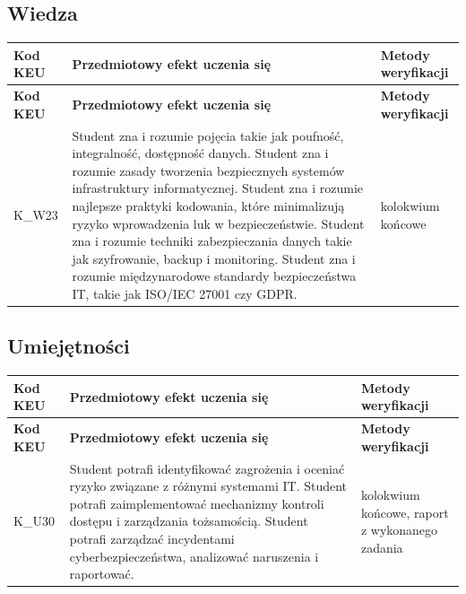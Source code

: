 \documentclass[12pt, a4paper]{article}
\newcommand{\thdrule}{\noalign{\global\setlength{\extrarowheight}{0pt}}}
\newcommand{\thdend}{\noalign{\global\setlength{\extrarowheight}{3pt}}}
\begin{document}
\subsection*{Wiedza}
{\scriptsize
\begin{longtable}{m{1.6cm}m{9.0cm}m{4.2cm}}
\thdrule\toprule
\rowcolor{pjatkRed} {\color{white}\footnotesize\textbf{\vphantom{Ag}Kod KEU}} & {\color{white}\footnotesize\textbf{\vphantom{Ag}Przedmiotowy efekt uczenia się}} & {\color{white}\footnotesize\textbf{\vphantom{Ag}Metody weryfikacji}} \\
\midrule\thdend
\endfirsthead
\thdrule\toprule
\rowcolor{pjatkRed} {\color{white}\footnotesize\textbf{\vphantom{Ag}Kod KEU}} & {\color{white}\footnotesize\textbf{\vphantom{Ag}Przedmiotowy efekt uczenia się}} & {\color{white}\footnotesize\textbf{\vphantom{Ag}Metody weryfikacji}} \\
\midrule\thdend
\endhead
  \rowcolor{tableRowLight} K\_W23 & Student zna i rozumie pojęcia takie jak poufność, integralność, dostępność danych. Student zna i rozumie zasady tworzenia bezpiecznych systemów infrastruktury informatycznej. Student zna i rozumie najlepsze praktyki kodowania, które minimalizują ryzyko wprowadzenia luk w bezpieczeństwie. Student zna i rozumie techniki zabezpieczania danych takie jak szyfrowanie, backup i monitoring. Student zna i rozumie międzynarodowe standardy bezpieczeństwa IT, takie jak ISO/IEC 27001 czy GDPR. & kolokwium końcowe \\
\bottomrule
\end{longtable}}

\subsection*{Umiejętności}
{\scriptsize
\begin{longtable}{m{1.6cm}m{9.0cm}m{4.2cm}}
\thdrule\toprule
\rowcolor{pjatkRed} {\color{white}\footnotesize\textbf{\vphantom{Ag}Kod KEU}} & {\color{white}\footnotesize\textbf{\vphantom{Ag}Przedmiotowy efekt uczenia się}} & {\color{white}\footnotesize\textbf{\vphantom{Ag}Metody weryfikacji}} \\
\midrule\thdend
\endfirsthead
\thdrule\toprule
\rowcolor{pjatkRed} {\color{white}\footnotesize\textbf{\vphantom{Ag}Kod KEU}} & {\color{white}\footnotesize\textbf{\vphantom{Ag}Przedmiotowy efekt uczenia się}} & {\color{white}\footnotesize\textbf{\vphantom{Ag}Metody weryfikacji}} \\
\midrule\thdend
\endhead
  \rowcolor{tableRowLight} K\_U30 & Student potrafi identyfikować zagrożenia i oceniać ryzyko związane z różnymi systemami IT. Student potrafi zaimplementować mechanizmy kontroli dostępu i zarządzania tożsamością. Student potrafi zarządzać incydentami cyberbezpieczeństwa, analizować naruszenia i raportować. & kolokwium końcowe, raport z wykonanego zadania \\
\bottomrule
\end{longtable}}
\end{document}
